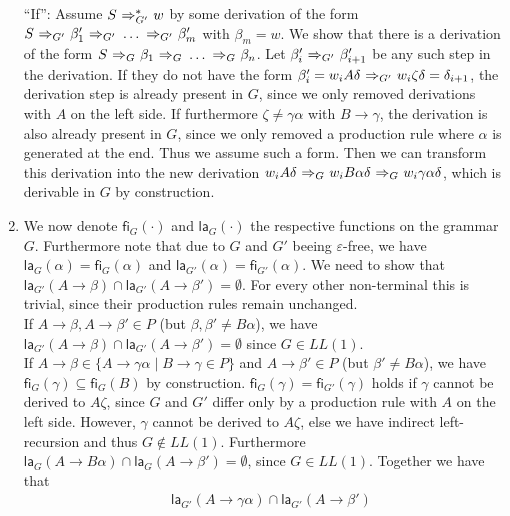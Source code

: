 \begin{solution}
\begin{enumerate}
		\enquote{If}: Assume $S ~{\Rightarrow_{G'}^*}~ w$ by some derivation of the form $S ~{\Rightarrow_{G'}}~ \beta'_1 ~{\Rightarrow_{G'}}~ \ldots ~{\Rightarrow_{G'}}~ \beta'_m$ with $\beta_m = w$. We show that there is a derivation of the form $S ~{\Rightarrow_{G}}~ \beta_1 ~{\Rightarrow_{G}}~ \ldots ~{\Rightarrow_{G}}~ \beta_n$. Let $\beta'_i ~{\Rightarrow_{G'}}~ \beta'_{i+1}$ be any such step in the derivation. If they do not have the form $\beta'_i = w_i A \delta ~{\Rightarrow_{G'}}~ w_i \zeta \delta = \delta_{i+1}$, the derivation step is already present in $G$, since we only removed derivations with $A$ on the left side. If furthermore $\zeta \neq \gamma \alpha$ with $B \rightarrow \gamma$, the derivation is also already present in $G$, since we only removed a production rule where $\alpha$ is generated at the end. Thus we assume such a form. Then we can transform this derivation into the new derivation $w_i A \delta ~{\Rightarrow_{G}}~ w_i B \alpha \delta ~{\Rightarrow_{G}}~ w_i \gamma \alpha \delta$, which is derivable in $G$ by construction. \\ 
		\item We now denote $\textsf{fi}_G( \cdot )$ and $\textsf{la}_G(\cdot)$ the respective functions on the grammar $G$. Furthermore note that due to $G$ and $G'$ beeing $\varepsilon$-free, we have $\textsf{la}_G(\alpha) = \textsf{fi}_G( \alpha )$ and $\textsf{la}_{G'}(\alpha) = \textsf{fi}_{G'}( \alpha )$. We need to show that $\textsf{la}_{G'}(A \rightarrow \beta) \cap \textsf{la}_{G'}(A \rightarrow \beta') = \emptyset$. For every other non-terminal this is trivial, since their production rules remain unchanged.  \\
		If $A \rightarrow \beta, A \rightarrow \beta' \in P$ (but $\beta, \beta' \neq B\alpha$), we have $\textsf{la}_{G'}(A \rightarrow \beta) \cap \textsf{la}_{G'}(A \rightarrow \beta') = \emptyset$ since $G \in LL(1)$. \\
		If $A \rightarrow \beta \in \{ A \rightarrow \gamma \alpha \mid B \rightarrow \gamma \in P \}$ and $A \rightarrow \beta' \in P$ (but $\beta' \neq B\alpha$), we have $\textsf{fi}_{G}(\gamma) \subseteq \textsf{fi}_{G}(B)$ by construction. $\textsf{fi}_{G}(\gamma)=\textsf{fi}_{G'}(\gamma)$ holds if $\gamma$ cannot be derived to $A\zeta$, since $G$ and $G'$ differ only by a production rule with $A$ on the left side. However, $\gamma$ cannot be derived to $A\zeta$, else we have indirect left-recursion and thus $G \not\in LL(1)$. Furthermore $\textsf{la}_G(A \rightarrow B \alpha) \cap \textsf{la}_G(A \rightarrow \beta') = \emptyset$, since $G \in LL(1)$. Together we have that 
		\begin{align*}
			&\; \textsf{la}_{G'}(A \rightarrow \gamma \alpha) \cap \textsf{la}_{G'}(A \rightarrow \beta') \\

\end{align*}
\end{enumerate}
\end{solution}
